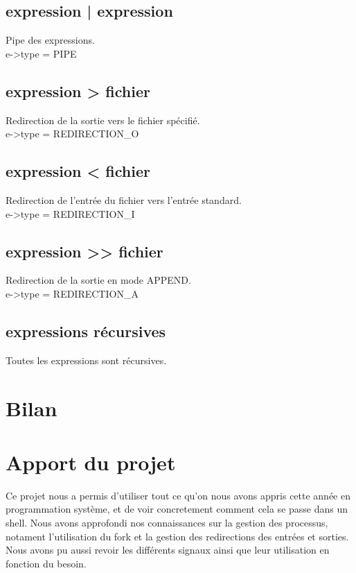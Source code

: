 \documentclass[12pt]{article}
\begin{document}
\subsection{expression | expression}
Pipe des expressions.
\\
e->type = PIPE

\subsection{expression > fichier}
Redirection de la sortie vers le fichier spécifié.
\\
e->type = REDIRECTION\_O

\subsection{expression < fichier}
Redirection de l'entrée du fichier vers l'entrée standard.
\\   
e->type = REDIRECTION\_I

\subsection{expression >> fichier}
Redirection de la sortie en mode APPEND.   
\\ 
e->type = REDIRECTION\_A   

\subsection{expressions récursives}
Toutes les expressions sont récursives.

\newpage
\section{Bilan}

\newpage
\section{Apport du projet}
Ce projet nous a permis d'utiliser tout ce qu'on nous avons appris cette année en programmation système, et de voir concretement comment cela se passe dans un shell.
Nous avons approfondi nos connaissances sur la gestion des processus, notament l'utilisation du fork et la gestion des redirections des entrées et sorties.
Nous avons pu aussi revoir les différents signaux ainsi que leur utilisation en fonction du besoin.
\end{document}
